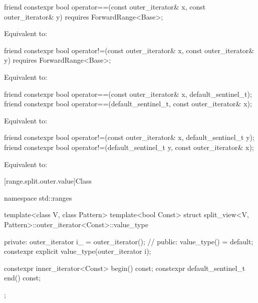 %
\begin{itemdecl}
friend constexpr bool operator==(const outer_iterator& x, const outer_iterator& y)
  requires ForwardRange<Base>;
\end{itemdecl}

\begin{itemdescr}
\pnum
\effects Equivalent to: 
\end{itemdescr}

%
\begin{itemdecl}
friend constexpr bool operator!=(const outer_iterator& x, const outer_iterator& y)
  requires ForwardRange<Base>;
\end{itemdecl}

\begin{itemdescr}
\pnum
\effects Equivalent to: 
\end{itemdescr}

%
\begin{itemdecl}
friend constexpr bool operator==(const outer_iterator& x, default_sentinel_t);
friend constexpr bool operator==(default_sentinel_t, const outer_iterator& x);
\end{itemdecl}

\begin{itemdescr}
\pnum
\effects
Equivalent to: 
\end{itemdescr}

%
\begin{itemdecl}
friend constexpr bool operator!=(const outer_iterator& x, default_sentinel_t y);
friend constexpr bool operator!=(default_sentinel_t y, const outer_iterator& x);
\end{itemdecl}

\begin{itemdescr}
\pnum
\effects Equivalent to: 
\end{itemdescr}

[range.split.outer.value]{Class }

\begin{codeblock}
namespace std::ranges {
  template<class V, class Pattern>
  template<bool Const>
  struct split_view<V, Pattern>::outer_iterator<Const>::value_type {
  private:
    outer_iterator i_ = outer_iterator();               // \expos
  public:
    value_type() = default;
    constexpr explicit value_type(outer_iterator i);

    constexpr inner_iterator<Const> begin() const;
    constexpr default_sentinel_t end() const;
  };
}
\end{codeblock}

